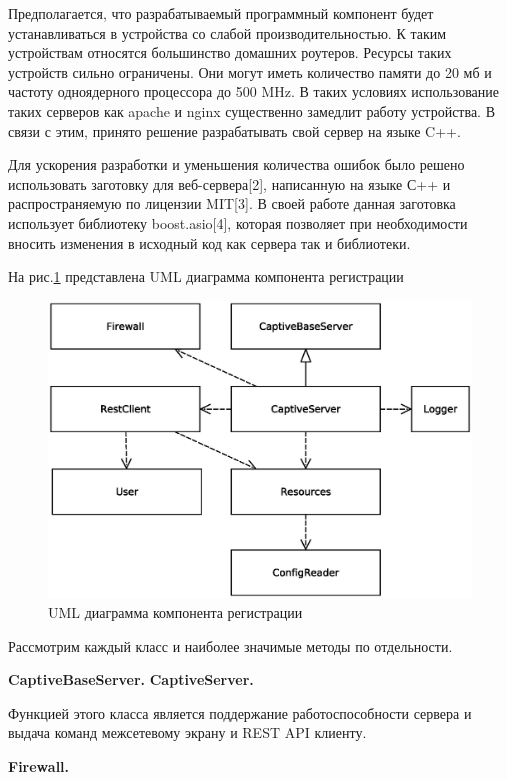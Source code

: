Предполагается, что разрабатываемый программный компонент будет устанавливаться в устройства со слабой производительностью. К таким устройствам относятся большинство домашних роутеров. Ресурсы таких устройств сильно ограничены. Они могут иметь количество памяти до 20 мб и частоту одноядерного процессора до 500 MHz. В таких условиях использование таких серверов как apache и nginx существенно замедлит работу устройства. В связи с этим, принято решение разрабатывать свой сервер на языке C++.

Для ускорения разработки и уменьшения количества ошибок было решено использовать заготовку для веб-сервера[2], написанную на языке С++ и распространяемую по лицензии MIT[3]. В своей работе данная заготовка использует библиотеку boost.asio[4], которая позволяет при необходимости вносить изменения в исходный код как сервера так и библиотеки.

На рис.\ref{fig:CPUML} представлена UML диаграмма компонента регистрации

\begin{figure}[H]
	\centering
	\includegraphics[width=\linewidth]{fig/CPUML}
	\caption{UML диаграмма компонента регистрации}
	\label{fig:CPUML}
\end{figure}

Рассмотрим каждый класс и наиболее значимые методы по отдельности.

\textbf{CaptiveBaseServer.}
\textbf{CaptiveServer.}

Функцией этого класса является поддержание работоспособности сервера и выдача команд межсетевому экрану и REST API клиенту.

\textbf{Firewall.}

